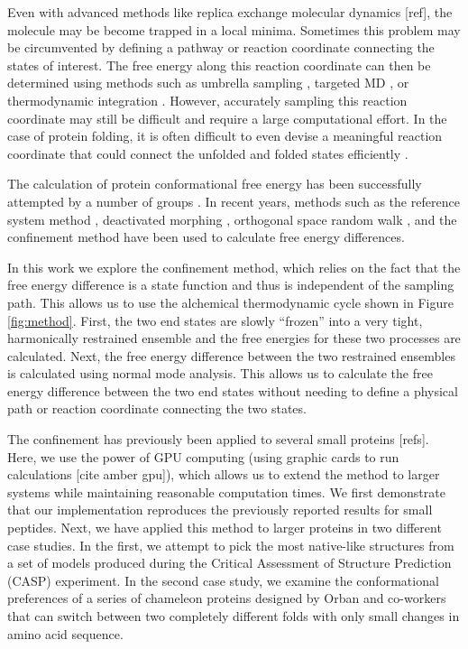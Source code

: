 \documentclass[12pt]{article}
\begin{document}
Even with advanced methods like replica exchange molecular dynamics [ref], the molecule may be
become trapped in a local minima. Sometimes this problem may be circumvented by defining a pathway
or reaction coordinate connecting the states of interest. The free energy along this reaction
coordinate can then be determined using methods such as umbrella sampling \cite{Torrie1977},
targeted MD \cite{}, or thermodynamic integration \cite{Tironi1994}. However, accurately sampling
this reaction coordinate may still be difficult and require a large computational effort. In the
case of protein folding, it is often difficult to even devise a meaningful reaction coordinate that
could connect the unfolded and folded states efficiently \cite{}.

The calculation of protein conformational free energy has been successfully attempted by a number of
groups \cite{Meirovitch2007,Ytreberg2006,Zheng2008}. In recent years, methods such as the reference
system method \cite{Ytreberg2006}, deactivated morphing \cite{Park2008}, orthogonal space random
walk \cite{Zheng2008}, and the confinement method \cite{Tyka2006,Cecchini2009} have been used to
calculate free energy differences.

In this work we explore the confinement method\cite{Tyka2006,Cecchini2009}, which relies on the fact
that the free energy difference is a state function and thus is independent of the sampling path.
This allows us to use the alchemical thermodynamic cycle shown in Figure \ref{fig:method}. First,
the two end states are slowly ``frozen'' into a very tight, harmonically restrained ensemble and the
free energies for these two processes are calculated. Next, the free energy difference between the
two restrained ensembles is calculated using normal mode analysis. This allows us to calculate the
free energy difference between the two end states without needing to define a physical path or
reaction coordinate connecting the two states.

The confinement has previously been applied to several small proteins [refs]. Here, we use the power
of GPU computing (using graphic cards to run calculations [cite amber gpu]), which allows us to
extend the method to larger systems while maintaining reasonable computation times. We first
demonstrate that our implementation reproduces the previously reported results for small peptides.
Next, we have applied this method to larger proteins in two different case studies. In the first, we
attempt to pick the most native-like structures from a set of models produced during the Critical
Assessment of Structure Prediction (CASP) \cite{} experiment. In the second case study, we examine
the conformational preferences of a series of chameleon proteins designed by Orban and co-workers
\cite{} that can switch between two completely different folds with only small changes in amino acid
sequence.
\end{document}
